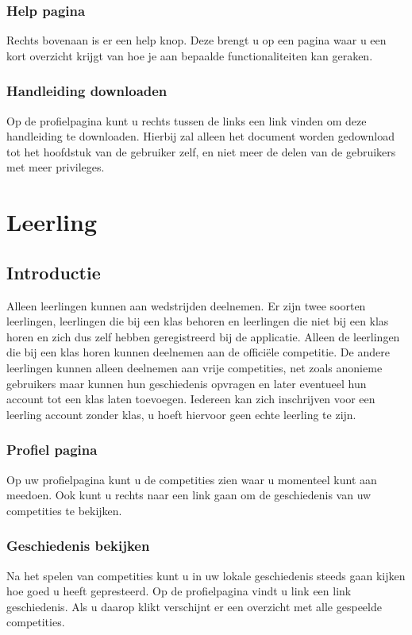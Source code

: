 \documentclass[11pt,a4paper]{report}
\begin{document}
\subsection{Help pagina}
Rechts bovenaan is er een help knop. Deze brengt u op een pagina waar u een kort overzicht krijgt van hoe je aan bepaalde functionaliteiten kan geraken. 

\subsection{Handleiding downloaden}
Op de profielpagina kunt u rechts tussen de links een link vinden om deze handleiding te downloaden. Hierbij zal alleen het document worden gedownload tot het hoofdstuk van de gebruiker zelf, en niet meer de delen van de gebruikers met meer privileges.



\chapter{Leerling}

\section{Introductie}
Alleen leerlingen kunnen aan wedstrijden deelnemen. Er zijn twee soorten leerlingen, leerlingen die bij een klas behoren en leerlingen die niet bij een klas horen en zich dus zelf hebben geregistreerd bij de applicatie. Alleen de leerlingen die bij een klas horen kunnen deelnemen aan de offici\"ele competitie. De andere leerlingen kunnen alleen deelnemen aan vrije competities, net zoals anonieme gebruikers maar kunnen hun geschiedenis opvragen en later eventueel hun account tot een klas laten toevoegen. Iedereen kan zich inschrijven voor een leerling account zonder klas, u hoeft hiervoor geen echte leerling te zijn.
\subsection{Profiel pagina}
Op uw profielpagina kunt u de competities zien waar u momenteel kunt aan meedoen. Ook kunt u rechts naar een link gaan om de geschiedenis van uw competities te bekijken.
\subsection{Geschiedenis bekijken}
Na het spelen van competities kunt u in uw lokale geschiedenis steeds gaan kijken hoe goed u heeft gepresteerd. Op de profielpagina vindt u link een link geschiedenis. Als u daarop klikt verschijnt er een overzicht met alle gespeelde competities.
\end{document}
